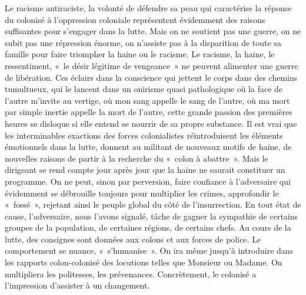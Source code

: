 \documentclass[french,twoside]{book} %
\begin{document}
Le racisme antiraciste, la volonté de défendre sa peau qui caractérise la réponse du colonisé à l’oppression coloniale représentent évidemment des raisons suffisantes pour s’engager dans la lutte. Mais on ne soutient pas une guerre, on ne subit pas une répression énorme, on n’assiste pas à la disparition de toute sa famille pour faire triompher la haine ou le racisme. Le racisme, la haine, le ressentiment, « le désir légitime de vengeance »   ne peuvent alimenter une guerre de libération. Ces éclairs dans la conscience qui jettent le corps dans des chemins tumultueux, qui le lancent dans un onirisme quasi pathologique où la face de l’autre m’invite au vertige, où mon sang appelle le sang de l’autre, où ma mort par simple inertie appelle la mort de l’autre, cette grande passion des premières heures se disloque si elle entend se nourrir de sa propre substance. Il est vrai que les interminables exactions des forces colonialistes réintroduisent les éléments émotionnels dans la lutte, donnent au militant de nouveaux motifs de haine, de nouvelles raisons de partir à la recherche du « colon à abattre ». Mais le dirigeant se rend compte jour après jour que la haine ne saurait constituer un programme. On ne peut, sinon par perversion, faire confiance à l’adversaire qui évidemment se débrouille toujours pour multiplier les crimes, approfondir le « fossé », rejetant ainsi le peuple global du côté de l’insurrection. En tout état de cause, l’adversaire, nous l’avons signalé, tâche de gagner la sympathie de certains groupes de la population, de certaines régions, de certains chefs. Au cours de la lutte, des consignes sont données aux colons et aux forces de police. Le comportement se nuance, « s’humanise ». On ira même jusqu’à introduire dans les rapports colon-colonisé des locutions telles que Monsieur ou Madame. On multipliera les politesses, les prévenances. Concrètement, le colonisé a l’impression d’assister à un changement.\par
\bigbreak
\end{document}
